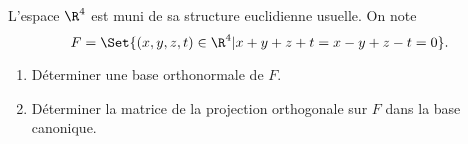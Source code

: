 \begin{enonce}
\begin{exercise}[ID={RMS 124 E1224 CCP PSI},subtitle={},tags={}]
L'espace $\R^4$ est muni de sa structure euclidienne usuelle.
On note 
\begin{equation*}
F=\Set{\left( x,y,z,t \right)\in\R^4 | x+y+z+t = x-y+z-t = 0}.
\end{equation*}
\begin{enumerate}
  \item Déterminer une base orthonormale de $F$.
  \item Déterminer la matrice de la projection orthogonale sur $F$ dans la base
    canonique.
\end{enumerate}
\end{exercise}
\begin{solution}
\end{solution}
\end{enonce}
